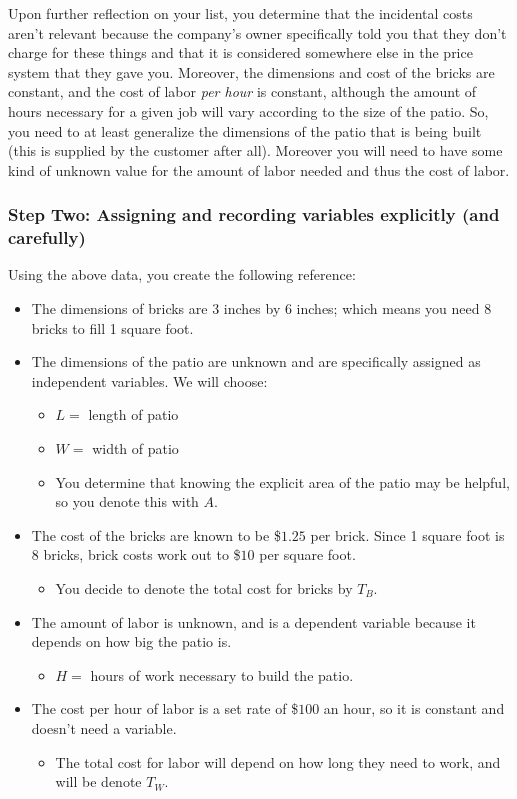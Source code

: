 {Upon further reflection on your list, you determine that the incidental costs aren't relevant because the company's owner specifically told you that they don't charge for these things and that it is considered somewhere else in the price system that they gave you. Moreover, the dimensions and cost of the bricks are constant, and the cost of labor \textit{per hour} is constant, although the amount of hours necessary for a given job will vary according to the size of the patio. So, you need to at least generalize the dimensions of the patio that is being built (this is supplied by the customer after all). Moreover you will need to have some kind of unknown value for the amount of labor needed and thus the cost of labor. 

\subsubsection*{Step Two: Assigning and recording variables explicitly (and carefully)}
Using the above data, you create the following reference:

\begin{itemize}
\item The dimensions of bricks are 3 inches by 6 inches; which means you need 8 bricks to fill 1 square foot.
\item The dimensions of the patio are unknown and are specifically assigned as independent variables. We will choose:
    \begin{itemize}
    \item $L =$ length of patio
    \item $W =$ width of patio
    \item You determine that knowing the explicit area of the patio may be helpful, so you denote this with $A$.
    \end{itemize}
\item The cost of the bricks are known to be \$$1.25$ per brick. Since 1 square foot is 8 bricks, brick costs work out to \$$10$ per square foot.
    \begin{itemize}
    \item You decide to denote the total cost for bricks by $T_B$.
    \end{itemize}
\item The amount of labor is unknown, and is a dependent variable because it depends on how big the patio is.
    \begin{itemize}
    \item $H =$ hours of work necessary to build the patio.
    \end{itemize}
\item The cost per hour of labor is a set rate of \$$100$ an hour, so it is constant and doesn't need a variable.
    \begin{itemize}
    \item The total cost for labor will depend on how long they need to work, and will be denote $T_W$.
    \end{itemize}
\end{itemize}

}
